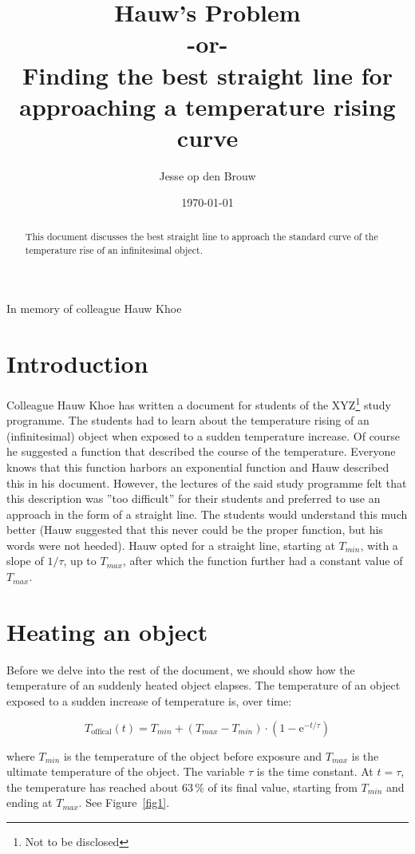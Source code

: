 \documentclass[12pt]{article}
\title{Hauw's Problem\\{\large\vspace*{0.5cm} -or-\\\vspace*{0.3cm}Finding the best straight line for approaching a temperature rising curve}}
\author{Jesse op den Brouw}
\date{\today}
\def\me{\mathrm{e}}
\begin{document}
\raggedbottom
\maketitle

\vfill
\begin{center}
In memory of colleague Hauw Khoe
\end{center}
\vfill

\begin{abstract}
\centering\noindent
This document discusses the best straight line to approach the standard curve of the temperature rise of an infinitesimal object.
\end{abstract}
\vfill

\clearpage

\section{Introduction}
Colleague Hauw Khoe has written a document for students of the XYZ\footnote{Not to be disclosed} study programme. The students had to learn about the temperature rising of an (infinitesimal) object when exposed to a sudden temperature increase. Of course he suggested a function that described the course of the temperature. Everyone knows that this function harbors an exponential function and Hauw described this in his document. However, the lectures of the said study programme felt that this description was ''too difficult'' for their students and preferred to use an approach in the form of a straight line. The students would understand this much better (Hauw suggested that this never could be the proper function, but his words were not heeded). Hauw opted for a straight line, starting at $T_{min}$, with a slope of $1/\tau$, up to $T_{max}$, after which the function further had a constant value of $T_{max}$.

\section{Heating an object}
Before we delve into the rest of the document, we should show how the temperature of an suddenly heated object elapses. The temperature of an object exposed to a sudden increase of temperature is, over time:

\begin{equation}
T_\text{offical}(t) = T_{min} + (T_{max} - T_{min})\cdot (1-\me^{-t/\tau})
\end{equation}

where $T_{min}$ is the temperature of the object before exposure and $T_{max}$ is the ultimate temperature of the object. The variable $\tau$ is the time constant. At $t=\tau$, the temperature has reached about $63\,\%$ of its final value, starting from $T_{min}$ and ending at $T_{max}$. See Figure~\ref{fig1}.
\end{document}
